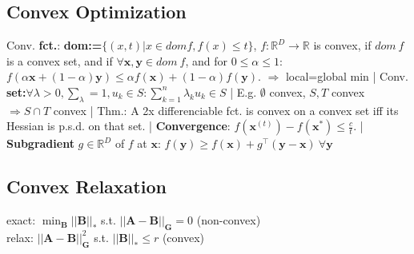 \subsection*{Convex Optimization}
Conv. \textbf{fct.}: \textbf{dom:=}$\{(x,t)|x \in dom f, f(x) \leq t\}$, $f : \mathbb{R}^D \rightarrow \mathbb{R}$ is convex, if $dom\ f$ is a convex set, and if $\forall \mathbf{x}, \mathbf{y} \in dom\ f$, and for $0 \leq \alpha \leq 1$: $f(\alpha \mathbf{x} + (1 - \alpha)\mathbf{y}) \leq \alpha f(\mathbf{x}) + (1-\alpha)f(\mathbf{y})$. $\Rightarrow$ local=global min 
| Conv. \textbf{set:}$\forall \lambda >0, \sum_\lambda = 1, u_k\in S: \sum_{k=1}^{n}\lambda_k u_k \in S$ 
| E.g. $\emptyset$ convex, $S, T$ convex $\Rightarrow S\cap T$ convex 
| Thm.: A 2x differenciable fct. is convex on a convex set iff its Hessian is p.s.d. on that set. 
| \textbf{Convergence}: $f(\mathbf{x}^{(t)}) - f(\mathbf{x}^*) \le \frac{c}{t}$. 
| \textbf{Subgradient} $g \in \mathbb{R}^D$ of $f$ at $\mathbf{x}$: $f(\mathbf{y}) \geq f(\mathbf{x}) + g^\top(\mathbf{y}-\mathbf{x}) \ \forall \mathbf{y}$

\subsection*{Convex Relaxation}
exact: $ \min_{ \mathbf{B} } || \mathbf{B} ||_{*}$ s.t. $|| \mathbf{A} - \textbf{B}  ||_{\mathbf{G}}=0$ (non-convex)\\
relax: $ || \mathbf{A} - \textbf{B}  ||_{\mathbf{G}}^2$ s.t. $ || \mathbf{B} ||_{*} \le r$ (convex)
